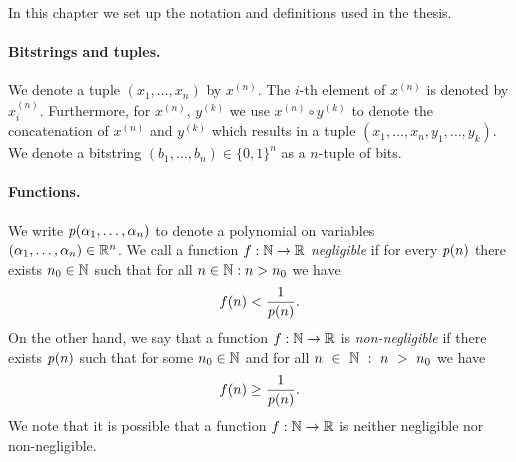 %
In this chapter we set up the notation and definitions used in the thesis.


\paragraph{Bitstrings and tuples.} We denote a tuple $(x_1, \dotsc, x_n)$ by $x^{(n)}$. The $i$-th element of $x^{(n)}$ is denoted by $x^{(n)}_i$.
Furthermore, for $x^{(n)}$, $y^{(k)}$ we use $x^{(n)} \circ y^{(k)}$ to denote the concatenation of $x^{(n)}$ and $y^{(k)}$ which results in
a tuple $(x_1, \dotsc, x_n, y_1, \dotsc, y_k)$.
We denote a bitstring $(b_1, \dotsc, b_n) \in \{0,1\}^{n}$ as a $n$-tuple of bits.

\paragraph{Functions.}
We write $\operatorname{\mathit{p}}(\alpha_1, \dots, \alpha_n)$ to denote a polynomial on variables\\
$(\alpha_1, \dots, \alpha_n) \in \mathbb{R}^n$. We call a function $f: \mathbb{N} \rightarrow \mathbb{R}$ \textit{negligible} if for every $\operatorname{\mathit{p}}(n)$
there exists $n_0 \in \mathbb{N}$ such that for all $n \in \mathbb{N} : n > n_0$ we have
\begin{align*}
f(n) < \frac{1}{\operatorname{\mathit{p}}(n)}.
\end{align*}
On the other hand, we say that a function $f: \mathbb{N} \rightarrow \mathbb{R}$ is \textit{non-negligible} if
there exists $\operatorname{\mathit{p}}(n)$ such that for some $n_0 \in \mathbb{N}$ and for all $n~\in~\mathbb{N}~:~n~>~n_0$ we have
\begin{align*}
  f(n) \geq \frac{1}{\operatorname{\mathit{p}}(n)}.
\end{align*}
We note that it is possible that a function $f:\mathbb{N} \rightarrow \mathbb{R}$ is neither negligible nor non-negligible.

